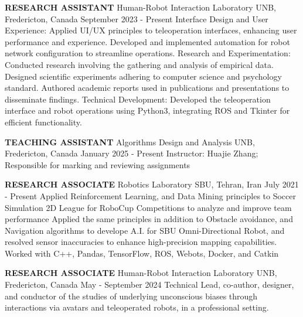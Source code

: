
\begin{cventries}
    \cventry
    {\textbf{RESEARCH ASSISTANT}}
    {Human-Robot Interaction Laboratory}
    {UNB, Fredericton, Canada}
    {September 2023 - Present}
    {Interface Design and User Experience: Applied UI/UX principles to teleoperation interfaces, enhancing user performance and experience. Developed and implemented automation for robot network configuration to streamline operations.
    \newline Research and Experimentation: Conducted research involving the gathering and analysis of empirical data. Designed scientific experiments adhering to computer science and psychology standard. Authored academic reports used in publications and presentations to disseminate findings.
    \newline Technical Development: Developed the teleoperation interface and robot operations using Python3, integrating ROS and Tkinter for efficient functionality.
    }
    \vspace{0.4 cm}
\end{cventries}

\begin{cventries}
    \cventry
    {\textbf{TEACHING ASSISTANT}}
    {Algorithms Design and Analysis}
    {UNB, Fredericton, Canada}
    {January 2025 - Present}
    {Instructor: Huajie Zhang; Responsible for marking and reviewing assignments}
    \vspace{0.4 cm}
\end{cventries}


\begin{cventries}
    \cventry
    {\textbf {RESEARCH ASSOCIATE}}
    {Robotics Laboratory}
    {SBU, Tehran, Iran}
    {July 2021 - Present}
    {Applied Reinforcement Learning, and Data Mining principles to Soccer Simulation 2D League for RoboCup Competitions to analyze and improve team performance 
    \newline Applied the same principles in addition to Obstacle avoidance, and Navigation algorithms to develope A.I. for SBU Omni-Directional Robot, 
    and resolved sensor inaccuracies to enhance high-precision mapping capabilities.
    \newline Worked with C++, Pandas, TensorFlow, ROS, Webots, Docker, and Catkin}
    \vspace{0.4 cm}
\end{cventries}

\begin{cventries}
    \cventry
    {\textbf{RESEARCH ASSOCIATE}}
    {Human-Robot Interaction Laboratory}
    {UNB, Fredericton, Canada}
    {May - September 2024}
    {Technical Lead, co-author, designer, and conductor of the studies of underlying unconscious biases through interactions via avatars and teleoperated robots, in a professional setting.
    }
    \vspace{0.4 cm}
\end{cventries}

